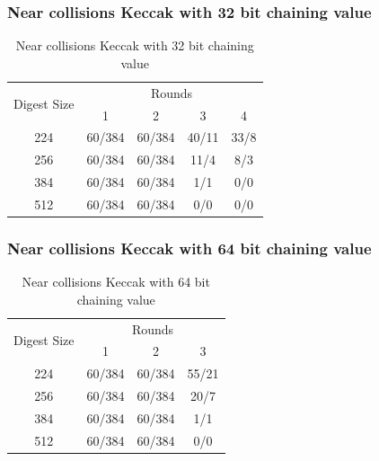 \documentclass{beamer}
\begin{document}
\begin{frame}
\frametitle{Near collisions Keccak with 32 bit chaining value}
\begin{table}
  \begin{center}
    \begin{tabular}{ | c | c | c | c | c | } \hline
     \multirow{2}{*}{Digest Size} & \multicolumn{4}{|c|}{Rounds} \\ \cline{2-5}
                 & 1      & 2      & 3     & 4    \\ \hline
     224         & 60/384 & 60/384 & 40/11 & 33/8 \\ \hline
     256         & 60/384 & 60/384 & 11/4  & 8/3  \\ \hline
     384         & 60/384 & 60/384 & 1/1   & 0/0  \\ \hline
     512         & 60/384 & 60/384 & 0/0   & 0/0  \\ \hline
    \end{tabular}
    \caption{Near collisions Keccak with 32 bit chaining value}
  \end{center}
\end{table}
\end{frame}

\begin{frame}
\frametitle{Near collisions Keccak with 64 bit chaining value}
\begin{table}
  \begin{tabular}{ | c | c | c | c | }  \hline
     \multirow{2}{*}{Digest Size} & \multicolumn{3}{|c|}{Rounds} \\ \cline{2-4}
                 & 1      & 2      & 3         \\ \hline
     224         & 60/384 & 60/384 & 55/21 \\ \hline
     256         & 60/384 & 60/384 & 20/7  \\ \hline
     384         & 60/384 & 60/384 & 1/1   \\ \hline
     512         & 60/384 & 60/384 & 0/0   \\ \hline
  \end{tabular}
  \caption{Near collisions Keccak with 64 bit chaining value}
\end{table}
\end{frame}
\end{document}
